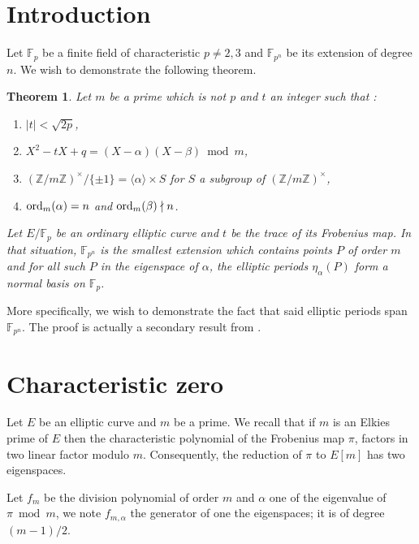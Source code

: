 \documentclass[a4paper]{article} %
\newcommand\zmodninv[1]{(\mathbb{Z}/#1\mathbb{Z})^{\times}}
\newcommand\GF[1]{\mathbb{F}_{#1}}
\newcommand\groupgen[1]{\langle{#1}\rangle}
\newcommand\ord[2]{\textup{ord}_{#1}(#2)}
\begin{document}
\newtheorem{thm}{Theorem}[section]
\newtheorem{lem}[thm]{Lemma}
\newtheorem{fac}[thm]{Fact}
\newtheorem{cor}[thm]{Corollary}
\newtheorem{prop}[thm]{Proposition}
\newtheorem{conj}[thm]{Conjecture}
\newtheorem*{thmn}{Théorème}
\theoremstyle{definition}
\newtheorem{defn}[thm]{Definition}
\newtheorem{defnp}[thm]{Définition et proposition}
\newtheorem*{ex}{Exemple}
\theoremstyle{remark}
\newtheorem*{rem}{Remarque}
\section{Introduction}
Let $\GF{p}$ be a finite field of characteristic $p\neq2, 3$ and $\GF{p^n}$ be
its extension of degree $n$. We wish to demonstrate the following theorem.

\begin{thm}
\label{conj:gaussellnorm}
Let $m$ be a prime which is not $p$ and $t$ an integer such that : 
\begin{enumerate}[1.]
    \item $|t| < \sqrt{2p}$,
    \item $X^2 - tX + q = (X - \alpha)(X - \beta)\bmod{m}$,
    \item $\zmodninv{m}/\lbrace{\pm1}\rbrace = \groupgen{\alpha}\times S$ for
$S$ a subgroup of $\zmodninv{m}$,
    \item $\ord{m}{\alpha} = n$ and $\ord{m}{\beta}\nmid n$.
\end{enumerate}
Let $E/\GF{p}$ be an ordinary elliptic curve and $t$ be the trace of its
Frobenius map. In that situation, $\GF{p^n}$ is the smallest extension which
contains points $P$ of order $m$ and for all such $P$ in the eigenspace of $\alpha$,
the elliptic periods $\eta_{\alpha}(P)$ form a normal basis on $\GF{p}$.
\end{thm}

More specifically, we wish to demonstrate the fact that said elliptic
periods span $\GF{p^n}$. The proof is actually a secondary result from \cite{MiMoSch}.

\section{Characteristic zero}

Let $E$ be an elliptic curve and $m$ be a prime. We recall that if $m$
is an Elkies prime of $E$ then the characteristic polynomial of the Frobenius
map $\pi$, factors in two linear factor modulo $m$. Consequently, the reduction of $\pi$
to $E[m]$ has two eigenspaces.\par
Let $f_m$ be the division polynomial of order $m$ and $\alpha$ one of the 
eigenvalue of $\pi\bmod{m}$, we note $f_{m,\alpha}$ the generator of one the 
eigenspaces; it is of degree $(m-1)/2$.
\end{document}

